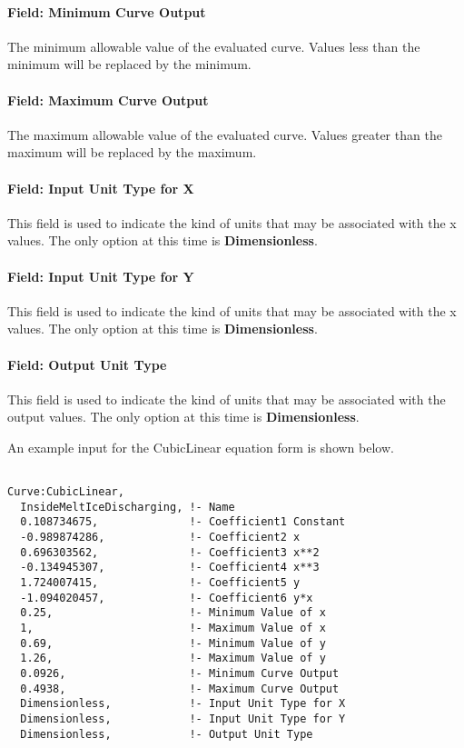 \paragraph{Field: Minimum Curve Output}\label{field-minimum-curve-output-7}

The minimum allowable value of the evaluated curve. Values less than the minimum will be replaced by the minimum.

\paragraph{Field: Maximum Curve Output}\label{field-maximum-curve-output-6}

The maximum allowable value of the evaluated curve. Values greater than the maximum will be replaced by the maximum.

\paragraph{Field: Input Unit Type for X}\label{field-input-unit-type-for-x-8}

This field is used to indicate the kind of units that may be associated with the x values. The only option at this time is \textbf{Dimensionless}.

\paragraph{Field: Input Unit Type for Y}\label{field-input-unit-type-for-y-3}

This field is used to indicate the kind of units that may be associated with the x values. The only option at this time is \textbf{Dimensionless}.

\paragraph{Field: Output Unit Type}\label{field-output-unit-type-7}

This field is used to indicate the kind of units that may be associated with the output values. The only option at this time is \textbf{Dimensionless}.

An example input for the CubicLinear equation form is shown below.

\begin{lstlisting}

Curve:CubicLinear,
  InsideMeltIceDischarging, !- Name
  0.108734675,              !- Coefficient1 Constant
  -0.989874286,             !- Coefficient2 x
  0.696303562,              !- Coefficient3 x**2
  -0.134945307,             !- Coefficient4 x**3
  1.724007415,              !- Coefficient5 y
  -1.094020457,             !- Coefficient6 y*x
  0.25,                     !- Minimum Value of x
  1,                        !- Maximum Value of x
  0.69,                     !- Minimum Value of y
  1.26,                     !- Maximum Value of y
  0.0926,                   !- Minimum Curve Output
  0.4938,                   !- Maximum Curve Output
  Dimensionless,            !- Input Unit Type for X
  Dimensionless,            !- Input Unit Type for Y
  Dimensionless,            !- Output Unit Type
\end{lstlisting}

